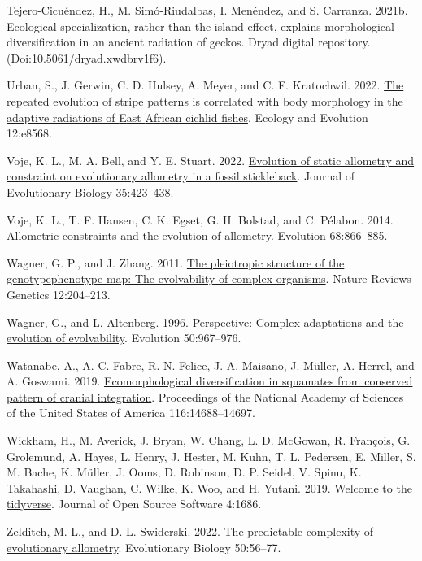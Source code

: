 \documentclass[
  11pt,
]{article}
\newlength{\cslhangindent}
\newlength{\cslentryspacingunit} %
\newenvironment{CSLReferences}[2] %
 {%
  \setlength{\parindent}{0pt}
  \ifodd #1
  \let\oldpar\par
  \def\par{\hangindent=\cslhangindent\oldpar}
  \fi
  \setlength{\parskip}{#2\cslentryspacingunit}
 }%
 {}
\begin{document}
\begin{CSLReferences}{1}{0}
\leavevmode{}%
Tejero-Cicuéndez, H., M. Simó-Riudalbas, I. Menéndez, and S. Carranza.
2021b. Ecological specialization, rather than the island effect,
explains morphological diversification in an ancient radiation of
geckos. Dryad digital repository. (Doi:10.5061/dryad.xwdbrv1f6).

\leavevmode{}%
Urban, S., J. Gerwin, C. D. Hulsey, A. Meyer, and C. F. Kratochwil.
2022. \href{https://doi.org/10.1002/ece3.8568}{The repeated evolution of
stripe patterns is correlated with body morphology in the adaptive
radiations of {E}ast {A}frican cichlid fishes}. Ecology and Evolution
12:e8568.

\leavevmode{}%
Voje, K. L., M. A. Bell, and Y. E. Stuart. 2022.
\href{https://doi.org/10.1111/jeb.13984}{Evolution of static allometry
and constraint on evolutionary allometry in a fossil stickleback}.
Journal of Evolutionary Biology 35:423--438.

\leavevmode{}%
Voje, K. L., T. F. Hansen, C. K. Egset, G. H. Bolstad, and C. Pélabon.
2014. \href{https://doi.org/10.1111/evo.12312}{Allometric constraints
and the evolution of allometry}. Evolution 68:866--885.

\leavevmode{}%
Wagner, G. P., and J. Zhang. 2011.
\href{https://doi.org/10.1038/nrg2949}{The pleiotropic structure of the
genotype{\textendash}phenotype map: The evolvability of complex
organisms}. Nature Reviews Genetics 12:204--213.

\leavevmode{}%
Wagner, G., and L. Altenberg. 1996.
\href{https://doi.org/10.1111/j.1558-5646.1996.tb02339.x}{Perspective:
Complex adaptations and the evolution of evolvability}. Evolution
50:967--976.

\leavevmode{}%
Watanabe, A., A. C. Fabre, R. N. Felice, J. A. Maisano, J. Müller, A.
Herrel, and A. Goswami. 2019.
\href{https://doi.org/10.1073/pnas.1820967116}{{Ecomorphological
diversification in squamates from conserved pattern of cranial
integration}}. Proceedings of the National Academy of Sciences of the
United States of America 116:14688--14697.

\leavevmode{}%
Wickham, H., M. Averick, J. Bryan, W. Chang, L. D. McGowan, R. François,
G. Grolemund, A. Hayes, L. Henry, J. Hester, M. Kuhn, T. L. Pedersen, E.
Miller, S. M. Bache, K. Müller, J. Ooms, D. Robinson, D. P. Seidel, V.
Spinu, K. Takahashi, D. Vaughan, C. Wilke, K. Woo, and H. Yutani. 2019.
\href{https://doi.org/10.21105/joss.01686}{Welcome to the {tidyverse}}.
Journal of Open Source Software 4:1686.

\leavevmode{}%
Zelditch, M. L., and D. L. Swiderski. 2022.
\href{https://doi.org/10.1007/s11692-022-09581-1}{The predictable
complexity of evolutionary allometry}. Evolutionary Biology 50:56--77.

\end{CSLReferences}
\end{document}

